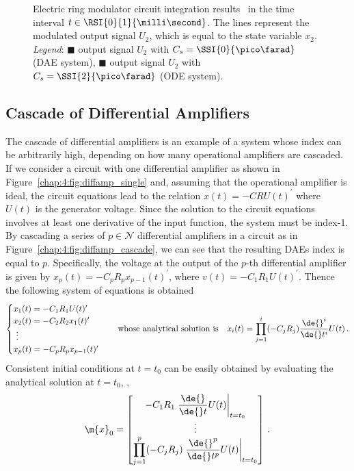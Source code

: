 \begin{figure}[htb]
  \centering
  \small{}
  \caption{Electric ring modulator circuit integration results~\cite{lioen1998test, mazzia2008test} in the time interval $t \in \RSI{0}{1}{\milli\second}$. The lines represent the modulated output signal $U_2$, which is equal to the state variable $x_2$. \emph{Legend}: \textcolor{mycolor1}{$\blacksquare$} output signal $U_2$ with $C_s = \SSI{0}{\pico\farad}$ (\ac{DAE} system), \textcolor{mycolor2}{$\blacksquare$} output signal $U_2$ with $C_s = \SSI{2}{\pico\farad}$ (\ac{ODE} system).}
  \label{chap4:fig:ring_modulator_results}
\end{figure}

\subsection{Cascade of Differential Amplifiers}

The cascade of differential amplifiers is an example of a system whose index can be arbitrarily high, depending on how many operational amplifiers are cascaded. If we consider a circuit with one differential amplifier as shown in Figure~\ref{chap:4:fig:diffamp_single} and, assuming that the operational amplifier is ideal, the circuit equations lead to the relation $x(t) = -C R U(t)^{\prime}$ where $U(t)$ is the generator voltage. Since the solution to the circuit equations involves at least one derivative of the input function, the system must be index-1. By cascading a series of $p \in \mathcal{N}$ differential amplifiers in a circuit as in Figure~\ref{chap:4:fig:diffamp_cascade}, we can see that the resulting \acp{DAE} index is equal to $p$. Specifically, the voltage at the output of the $p$-th differential amplifier is given by $x_p(t) = -C_p R_p x_{p-1}(t)^{\prime}$, where $v(t) = -C_1 R_1 U(t)^{\prime}$. Thence the following system of equations is obtained
%
\begin{equation*}
  \begin{cases}
    x_1(t) = -C_1 R_1 U(t)^{\prime} \\
    x_2(t) = -C_2 R_2 x_1(t)^{\prime} \\
    ~\vdots \\
    x_p(t) = -C_p R_p x_{p-1}(t)^{\prime}
  \end{cases}
  \quad \text{whose analytical solution is} \quad
  x_i(t) = \prod_{j=1}^{i} (-C_j R_j) \dfrac{\de{}^{i}}{\de{}t^{i}}U(t) \, \text{.}
\end{equation*}
%
Consistent initial conditions at $t = t_0$ can be easily obtained by evaluating the analytical solution at $t = t_0$, \ie{},
%
\begin{equation*}
  \m{x}_0 = \begin{bmatrix}
    -C_1 R_1 \left.\dfrac{\de{}}{\de{}t}U(t)\right|_{t=t_0} \\
    \vdots \\
    \displaystyle\prod_{j=1}^{p} (-C_j R_j) \left.\dfrac{\de{}^{p}}{\de{}t^{p}}U(t)\right|_{t=t_0}
  \end{bmatrix} \, \text{.}
\end{equation*}

